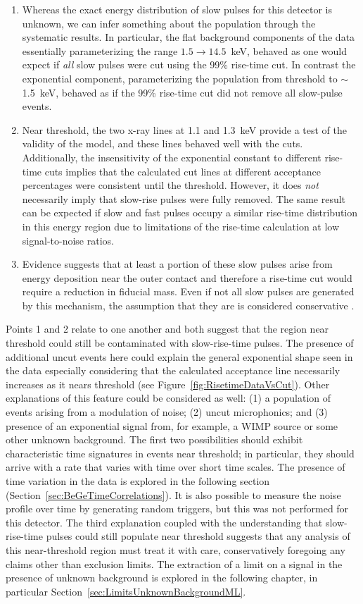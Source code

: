 	\begin{enumerate}
		\item Whereas the exact energy distribution of slow pulses for this detector is unknown, we can infer something about the population through the systematic results.  In particular, the flat background components of the data essentially parameterizing the range $1.5\to14.5$~keV, behaved as one would expect if \emph{all} slow pulses were cut using the 99\% rise-time cut.  In contrast the exponential component, parameterizing the population from threshold to $\sim$1.5~keV, behaved as if the 99\% rise-time cut did not remove all slow-pulse events.  
		\item Near threshold, the two x-ray lines at 1.1 and 1.3~keV provide a test of the validity of the model, and these lines behaved well with the cuts.  Additionally, the insensitivity of the exponential constant to different rise-time cuts implies that the calculated cut lines at different acceptance percentages were consistent until the threshold.  However, it does \emph{not} necessarily imply that slow-rise pulses were fully removed.  The same result can be expected if slow and fast pulses occupy a similar rise-time distribution in this energy region due to limitations of the rise-time calculation at low signal-to-noise ratios.
		\item Evidence suggests that at least a portion of these slow pulses arise from energy deposition near the outer contact
		and therefore a rise-time cut would require a reduction in fiducial mass.  Even if not all slow pulses are generated by this
		mechanism, the assumption that they are is considered conservative .  
	\end{enumerate}
	
	Points 1 and 2 relate to one another and both suggest that the region near threshold could still be contaminated with slow-rise-time pulses.  The presence of additional uncut events here could explain the general exponential shape seen in the data especially considering that the calculated acceptance line necessarily increases as it nears threshold (see Figure~\ref{fig:RisetimeDataVsCut}).  Other explanations of this feature could be considered as well: (1) a population of events arising from a modulation of noise; (2) uncut microphonics; and (3) presence of an exponential signal from, for example, a WIMP source or some other unknown background.  The first two possibilities should exhibit characteristic time signatures in events near threshold; in particular, they should arrive with a rate that varies with time over short time scales.  The presence of time variation in the data is explored in the following section (Section~\ref{sec:BeGeTimeCorrelations}).  It is also possible to measure the noise profile over time by generating random triggers, but this was not performed for this detector.  The third explanation coupled with the understanding that slow-rise-time pulses could still populate near threshold suggests that any analysis of this near-threshold region must treat it with care, conservatively foregoing any claims other than exclusion limits.  The extraction of a limit on a signal in the presence of unknown background is explored in the following chapter, in particular Section~\ref{sec:LimitsUnknownBackgroundML}.  
	
